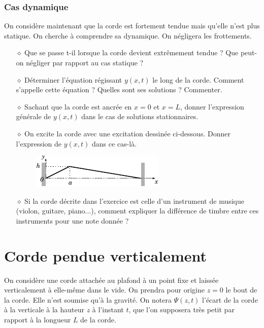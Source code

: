 \documentclass{report}
\begin{document}
\subsubsection*{Cas dynamique}

On considère maintenant que la corde est fortement tendue mais qu'elle n'est plus statique. On cherche à comprendre sa dynamique. On négligera les frottements.

\begin{itemize}

	\item[$\diamond$] Que se passe t-il lorsque la corde devient extrêmement tendue ? Que peut-on négliger par rapport au cas statique ?

	\item[$\diamond$] Déterminer l'équation régissant $y(x,t)$ le long de la corde. Comment s'appelle cette équation ? Quelles sont ses solutions ? Commenter.
	
	\item[$\diamond$] Sachant que la corde est ancrée en $x=0$ et $x=L$, donner l'expression générale de $y(x,t)$ dans le cas de solutions stationnaires. 
	
	\item[$\diamond$] On excite la corde avec une excitation dessinée ci-dessous. Donner l'expression de $y(x,t)$ dans ce cas-là.
	
	\begin{figure}[h!]
	\centering
		\includegraphics[scale=1.5]{onde2.pdf}
	\end{figure}

	\item[$\diamond$] Si la corde décrite dans l'exercice est celle d'un instrument de musique (violon, guitare, piano...), comment expliquer la différence de timbre entre ces instruments pour une note donnée ?
	
\end{itemize}

\newpage

\section*{Corde pendue verticalement}

On considère une corde attachée au plafond à un point fixe et laissée verticalement à elle-même dans le vide. On prendra pour origine $z=0$ le bout de la corde. Elle n'est soumise qu'à la gravité. On notera $\Psi(z,t)$ l'écart de la corde à la verticale à la hauteur $z$ à l'instant $t$, que l'on supposera très petit par rapport à la longueur $L$ de la corde.
\end{document}
